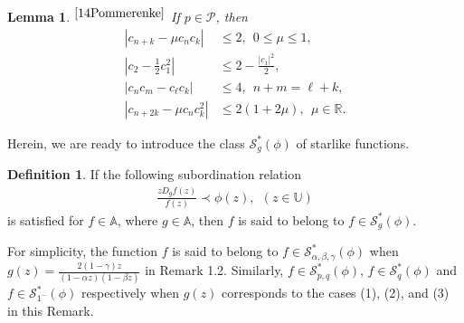 \documentclass[11pt,twoside, reqno]{article}
\newtheorem{lemma}[theorem]{Lemma}
\theoremstyle{definition}
\newtheorem{definition}[theorem]{Definition}
\begin{document}
\begin{lemma}$^{\cite{14Pommerenke}}$
If $p \in \mathcal{P}$, then
\begin{align*}
\left|c_{n+k} - \mu c_n c_k\right| &\leq 2, \ \   0 \leq \mu \leq 1, \\
\left|c_2 - \frac{1}{2} c_1^2\right| &\leq 2 - \frac{\left|c_1\right|^2}{2}, \\
\left|c_n c_m - c_\ell c_k\right| &\leq 4, \ \   n+m = \ell+k, \\
\left|c_{n+2k} - \mu c_n c_k^2\right| &\leq 2(1+2\mu), \ \   \mu \in \mathbb{R}.
\end{align*}
\end{lemma}

Herein, we are ready to introduce the class $\mathcal{S}^{\ast }_{g}(\phi)$ of starlike functions.

\begin{definition}
If the following subordination relation
\begin{align}
\frac{zD_{g}f(z)}{f(z)}\prec \phi(z),\ \  (z\in\mathbb{U})\nonumber
\end{align}
is satisfied for $f\in \mathbb{A}$, where $g\in \mathbb{A}$, then $f$ is said to belong to $f\in\mathcal{S}^{\ast }_{g}(\phi)$.

For simplicity, the function $f$ is said to belong to $f\in\mathcal{S}^{\ast }_{\alpha, \beta, \gamma}(\phi)$ when $g(z)=\frac{2(1-\gamma)z}{(1-\alpha z)(1-\beta z)}$ in Remark 1.2. Similarly,  $f\in\mathcal{S}^{\ast }_{p,q}(\phi)$, $f\in\mathcal{S}^{\ast }_{q}(\phi)$ and $f\in\mathcal{S}^{\ast }_{1^{-}}(\phi)$ respectively when $g(z)$ corresponds to the cases (1), (2), and (3) in this Remark.


\end{definition}
\end{document}
